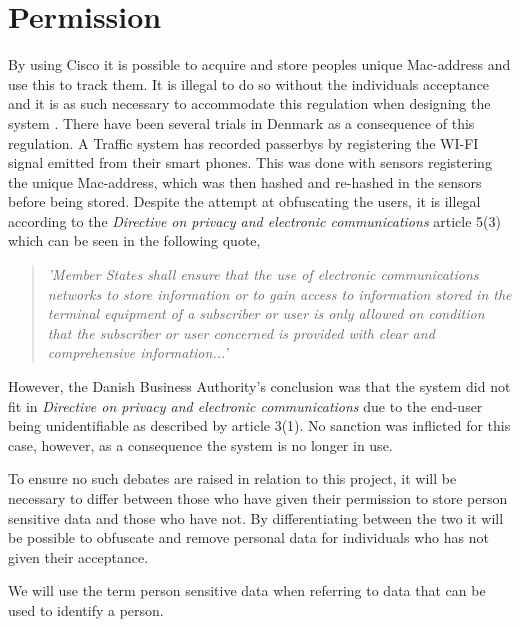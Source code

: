 \section{Permission} \label{sec:permission}
By using Cisco it is possible to acquire and store peoples unique Mac-address and use this to track them. It is illegal to do so without the individuals acceptance and it is as such necessary to accommodate this regulation when designing the system \cite{TrafficIlligal}.
There have been several trials in Denmark as a consequence of this regulation. A Traffic system has recorded passerbys by registering the WI-FI signal emitted from their smart phones. This was done with sensors registering the unique Mac-address, which was then hashed and re-hashed in the sensors before being stored. Despite the attempt at obfuscating the users\cite{TrafficIlligal}, it is illegal according to the \textit{Directive on privacy and electronic communications} article 5(3)\cite{CookieDirective} which can be seen in the following quote,

\begin{quote}
\textit{'Member States shall ensure that the use of electronic communications networks to store information or to gain access to information stored in the terminal equipment of a subscriber or user is only allowed on condition that the subscriber or user concerned is provided with clear and comprehensive information...'}
\end{quote}

However, the Danish Business Authority's conclusion was that the system did not fit in \textit{Directive on privacy and electronic communications} due to the end-user being unidentifiable\cite{TrafficOK} as described by article 3(1)\cite{CookieDirective}. No sanction was inflicted for this case, however, as a consequence the system is no longer in use.

To ensure no such debates are raised in relation to this project, it will be necessary to differ between those who have given their permission to store person sensitive data and those who have not. By differentiating between the two it will be possible to obfuscate and remove personal data for individuals who has not given their acceptance.

We will use the term person sensitive data when referring to data that can be used to identify a person. 
